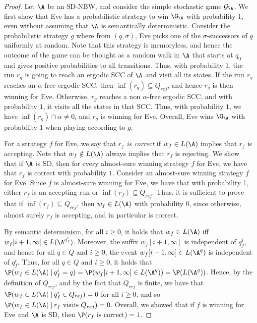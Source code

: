 \documentclass{lmcs}
\begin{document}
\begin{proof}
Let $\A$ be an SD-NBW, and consider the simple stochastic \buchi game  $\mathcal{G}_\A$.
We first show that Eve has a probabilistic strategy to win $\G_\A$ with probability $1$, even without assuming that $\A$ is semantically deterministic. Consider the probabilistic strategy $g$ where from $(q,\sigma)$, Eve picks one of the $\sigma$-successors of $q$ uniformly at random. Note that this strategy is memoryless, and hence the outcome of the game can be thought as a random walk in $\A$ that starts at $q_0$ and gives positive probabilities to all transitions. Thus, with probability $1$, the run $r_g$ is going to reach an ergodic SCC of $\A$ and visit all its states.  If the run $r_g$ reaches an $\alpha$-free ergodic SCC, then $\inf(r_g)\subseteq Q_{rej}$, and hence $r_g$ is then winning for Eve. Otherwise, $r_g$ reaches a non $\alpha$-free ergodic SCC, and with probability $1$, it visits  all the states in that SCC. Thus, with probability $1$, we have $\inf(r_g)\cap \alpha\neq 0$, and $r_g$ is winning for Eve. Overall, Eve wins $\G_\A$ with probability $1$ when playing according to $g$.

For a strategy $f$ for Eve, we say that {\em $r_f$ is correct} if $w_f\in L(\A)$ implies that $r_f$ is accepting. Note that $w_f\notin L(\A)$ always implies that $r_f$ is rejecting. We show that if $\A$ is SD, then for every almost-sure winning strategy $f$ for Eve, we have that $r_f$ is correct with probability $1$. 
Consider an almost-sure winning strategy $f$ for Eve. Since $f$ is almost-sure winning for Eve, we have that with probability 1, either $r_f$ is an accepting run or $\inf(r_f)\subseteq Q_{rej}$. Thus, it is sufficient to prove that if $\inf(r_f)\subseteq Q_{rej}$, then $w_f\in L(\A)$ with probability $0$, since otherwise, almost surely $r_f$ is accepting, and in particular is correct. 

By semantic determinism, for all $i\geq 0$, it holds that $w_f\in L(\A)$ iff $w_f[i+1,\infty]\in L(\A^{q_f^i})$. Moreover, the 
suffix $w_f[i+1,\infty]$ is independent of $q^i_f$, and hence for all $q\in Q$ and $i\geq 0$, the event $w_f[i+1,\infty]\in L(\A^{q})$ is independent of $q^i_f$.
Thus, for all $q\in Q$ and $i\geq 0$, it holds that $\P(w_f\in L(\A)\: | \: q_f^i=q)=\P(w_f[i+1,\infty]\in L(\A^q))=\P(L(\A^q))$. Hence, by the definition of $Q_{rej}$, and by the fact that $Q_{rej}$ is finite, we have that $\P(w_f\in L(\A)\: | \: q_f^i\in Q_{rej})=0$ for all $i\geq 0$, and so $\P(w_f\in L(\A)\: | \: r_f\text{ visits }Q_{rej})=0$. Overall, we showed that if $f$ is winning for Eve and $\A$ is SD, then $\P(r_f\text{ is correct})=1$.


\end{proof}
\end{document}
